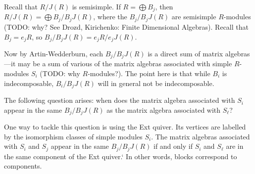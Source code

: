 Recall that $R/J(R)$ is semisimple. If $R = \bigoplus B_j$, then
$R/J(R) = \bigoplus B_j/B_jJ(R)$, where the $B_j/B_jJ(R)$ are semisimple $R$-modules
(TODO: why? See Drozd, Kirichenko: Finite Dimensional Algebras).
Recall that $B_j = e_jR$, so $B_j/B_jJ(R) = e_jR/e_jJ(R)$.

Now by Artin-Wedderburn, each $B_j/B_jJ(R)$ is a direct sum of matrix
algebras---it may be a sum of various of the matrix algebras associated with
simple $R$-modules $S_i$ (TODO: why $R$-modules?).
The point here is that while $B_i$ is indecomposable, $B_i/B_jJ(R)$ will in general
not be indecomposable.

The following question arises: when does the matrix algebra associated with
$S_i$ appear in the same $B_j/B_jJ(R)$ as the matrix algebra associated with
$S_\ell$?

One way to tackle this question is using the Ext quiver. Its vertices are labelled by
the isomorphism classes of simple modules $S_i$. The matrix algebras associated with
$S_i$ and $S_j$ appear in the same $B_j/B_jJ(R)$ if and only if $S_i$ and $S_\ell$
are in the same component of the Ext quiver.`
In other words, blocks correspond to components.

